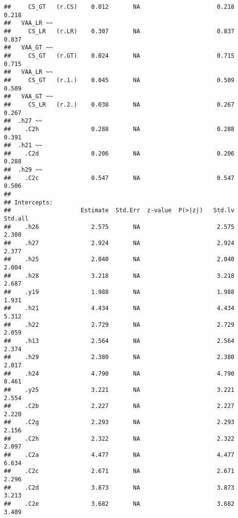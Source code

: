 \documentclass[
]{article}
\begin{document}
\begin{verbatim}
##     CS_GT   (r.CS)    0.012       NA                      0.218    0.218
##   VAA_LR ~~                                                             
##     CS_LR   (r.LR)    0.307       NA                      0.837    0.837
##   VAA_GT ~~                                                             
##     CS_GT   (r.GT)    0.024       NA                      0.715    0.715
##   VAA_LR ~~                                                             
##     CS_GT   (r.1.)    0.045       NA                      0.509    0.509
##   VAA_GT ~~                                                             
##     CS_LR   (r.2.)    0.038       NA                      0.267    0.267
##  .h27 ~~                                                                
##    .C2h               0.288       NA                      0.288    0.391
##  .h21 ~~                                                                
##    .C2d               0.206       NA                      0.206    0.288
##  .h29 ~~                                                                
##    .C2c               0.547       NA                      0.547    0.506
## 
## Intercepts:
##                    Estimate  Std.Err  z-value  P(>|z|)   Std.lv  Std.all
##    .h26               2.575       NA                      2.575    2.300
##    .h27               2.924       NA                      2.924    2.377
##    .h25               2.040       NA                      2.040    2.004
##    .h28               3.218       NA                      3.218    2.687
##    .y19               1.988       NA                      1.988    1.931
##    .h21               4.434       NA                      4.434    5.312
##    .h22               2.729       NA                      2.729    2.059
##    .h13               2.564       NA                      2.564    2.374
##    .h29               2.380       NA                      2.380    2.017
##    .h24               4.790       NA                      4.790    8.461
##    .y25               3.221       NA                      3.221    2.554
##    .C2b               2.227       NA                      2.227    2.220
##    .C2g               2.293       NA                      2.293    2.156
##    .C2h               2.322       NA                      2.322    2.097
##    .C2a               4.477       NA                      4.477    6.634
##    .C2c               2.671       NA                      2.671    2.296
##    .C2d               3.873       NA                      3.873    3.213
##    .C2e               3.682       NA                      3.682    3.409

\end{verbatim}
\end{document}
